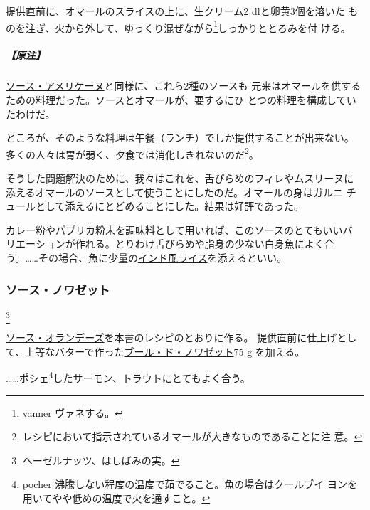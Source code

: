 \begin{recette}
提供直前に、オマールのスライスの上に、生クリーム2 dlと卵黄3個を溶いた
ものを注ぎ、火から外して、ゆっくり混ぜながら\footnote{vanner
  ヴァネする。}しっかりととろみを付 ける。

\hypertarget{nota-sauce-new-burg-b}{%
\subparagraph{【原注】}\label{nota-sauce-new-burg-b}}

\protect\hyperlink{sauce-americaine}{ソース・アメリケーヌ}と同様に、これら2種のソースも
元来はオマールを供するための料理だった。ソースとオマールが、要するにひ
とつの料理を構成していたわけだ。

ところが、そのような料理は午餐（ランチ）でしか提供することが出来ない。
多くの人々は胃が弱く、夕食では消化しきれないのだ\footnote{レシピにおいて指示されているオマールが大きなものであることに注
  意。}。

そうした問題解決のために、我々はこれを、舌びらめのフィレやムスリーヌに
添えるオマールのソースとして使うことにしたのだ。オマールの身はガルニ
チュールとして添えるにとどめることにした。結果は好評であった。

カレー粉やパプリカ粉末を調味料として用いれば、このソースのとてもいいバ
リエーションが作れる。とりわけ舌びらめや脂身の少ない白身魚によく合
う。\ldots{}\ldots{}その場合、魚に少量の\protect\hyperlink{riz-indienne}{インド風ライス}を添えるといい。

\maeaki

\hypertarget{sauce-noisette}{%
\subsubsection{ソース・ノワゼット}\label{sauce-noisette}}

\footnote{ヘーゼルナッツ、はしばみの実。}


\protect\hyperlink{sauce-hollandaise}{ソース・オランデーズ}を本書のレシピのとおりに作る。
提供直前に仕上げとして、上等なバターで作った\protect\hyperlink{beurre-de-noisette}{ブール・ド・ノワゼット}75
g を加える。

\ldots{}\ldots{}ポシェ\footnote{pocher
  沸騰しない程度の温度で茹でること。魚の場合は\protect\hyperlink{court-bouillon-a}{クールブイ
  ヨン}を用いてやや低めの温度で火を通すこと。}したサーモン、トラウトにとてもよく合う。


\end{recette}
